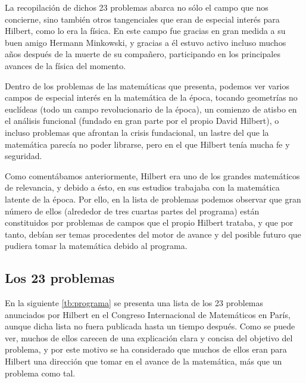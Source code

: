 La recopilación de dichos 23 problemas abarca no sólo el campo que nos concierne, sino también otros tangenciales que eran de especial 
interés para Hilbert, como lo era la física. En este campo fue gracias en gran medida a su buen amigo Hermann Minkowski,
y gracias a él estuvo activo incluso muchos años después de la muerte de su compañero, participando en los principales avances de la física del momento.

Dentro de los problemas de las matemáticas que presenta, podemos ver varios campos de especial interés en la matemática de la época, tocando geometrías no euclídeas
(todo un campo revolucionario de la época), un comienzo de atisbo en el análisis funcional (fundado en gran parte por el propio David Hilbert),
o incluso problemas que afrontan la crisis fundacional, un lastre del que la matemática parecía no poder librarse, pero en el que Hilbert 
tenía mucha fe y seguridad.

Como comentábamos anteriormente, Hilbert era uno de los grandes matemáticos de relevancia, y debido a ésto, en sus estudios trabajaba con la 
matemática latente de la época. Por ello, en la lista de problemas podemos observar que gran número de ellos (alrededor de tres cuartas partes del
programa) están constituidos por problemas de campos que el propio Hilbert trataba, y que por tanto, debían ser temas procedentes del motor de avance
y del posible futuro que pudiera tomar la matemática debido al programa. 

  
\subsection{Los 23 problemas}

En la siguiente \autoref{tb:programa} se presenta una lista de los 23 problemas anunciados por Hilbert en el Congreso Internacional de Matemáticos en París,
aunque dicha lista no fuera publicada hasta un tiempo después. Como se puede ver, muchos de ellos carecen de una explicación clara y concisa del objetivo del problema,
y por este motivo se ha considerado que muchos de ellos eran para Hilbert una dirección que tomar en el avance de la matemática, más que un problema como tal.

